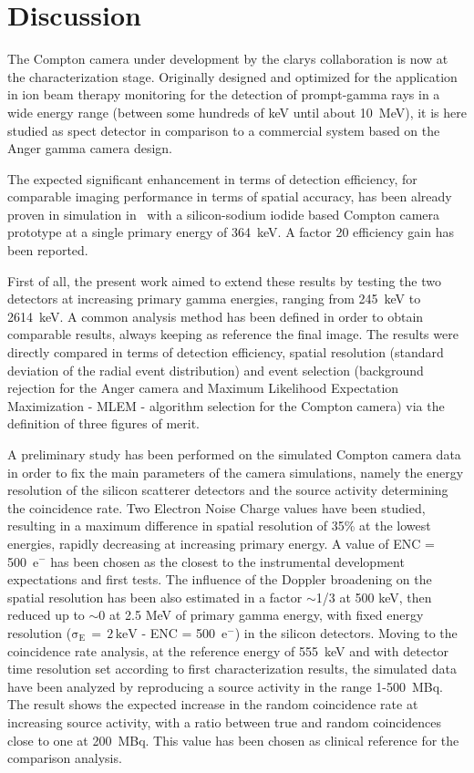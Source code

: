 \section{Discussion}\label{chap5::sec::Conclusions}

The Compton camera under development by the \gls{clarys} collaboration is now at the characterization stage. Originally designed and optimized for the application in ion beam therapy monitoring  for the detection of prompt-gamma rays in a wide energy range (between some hundreds of keV until about 10~MeV), it is here studied as \gls{spect} detector in comparison to a commercial system based on the Anger gamma camera design.

The expected significant enhancement in terms of detection efficiency, for comparable imaging performance in terms of spatial accuracy, has been already proven in simulation in~\parencite{Han2008} with a silicon-sodium iodide based Compton camera prototype at a single primary energy of 364~keV. A factor 20 efficiency gain has been reported.

First of all, the present work aimed to extend these results by testing the two detectors at increasing primary gamma energies, ranging from 245~keV to 2614~keV. A common analysis method has been defined in order to obtain comparable results, always keeping as reference the final image. The results were directly compared in terms of  detection efficiency, spatial resolution (standard deviation of the radial event distribution) and event selection (background rejection for the Anger camera and Maximum Likelihood Expectation Maximization - MLEM - algorithm selection for the Compton camera) via the definition of three figures of merit.

A preliminary study has been performed on the simulated Compton camera data in order to fix the main parameters of the camera simulations, namely the energy resolution of the silicon scatterer detectors and the source activity determining the coincidence rate. Two Electron Noise Charge values have been studied, resulting in a maximum difference in spatial resolution of 35\% at the lowest energies, rapidly decreasing at increasing primary energy. A value of ENC = 500~e$^-$ has been chosen as the closest to the instrumental development expectations and first tests. The influence of the Doppler broadening on the spatial resolution has been also estimated in a factor $\sim$1/3 at 500 keV, then reduced up to $\sim$0 at 2.5 MeV of primary gamma energy, with fixed energy resolution ($\mathrm{\sigma_{E}\,=\,2\,keV}$ - ENC = 500~e$^-$) in the silicon detectors. Moving to the coincidence rate analysis, at the reference energy of 555~keV and with detector time resolution set according to first characterization results, the simulated data have been analyzed by reproducing a source activity in the range 1-500~MBq. The result shows the expected increase in the random coincidence rate at increasing source activity, with a ratio between true and random coincidences close to one at 200~MBq. This value has been chosen as clinical reference for the comparison analysis.

